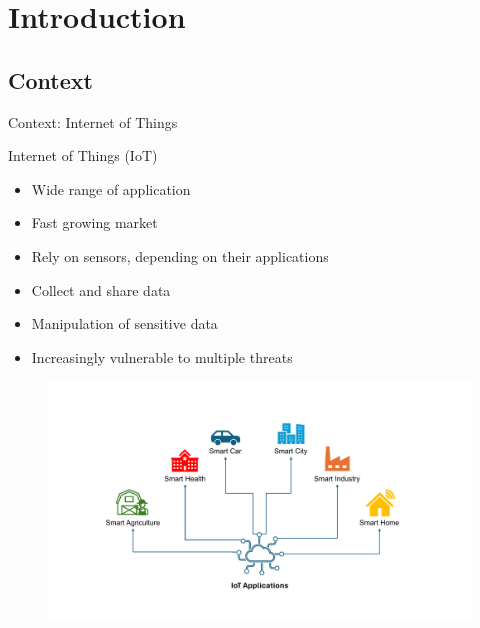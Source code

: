 \section*{Introduction}

\subsection{Context}
\begin{frame}{Context: Internet of Things}
    \begin{minipage}[c]{0.5\textwidth}
        \begin{block}{Internet of Things (IoT)}
            \begin{itemize}
                [square]
                \justifying
                \item Wide range of application
                \item Fast growing market
                \item Rely on sensors, depending on their applications
                \item Collect and share data
                \item Manipulation of sensitive data
                \item Increasingly vulnerable to multiple threats
            \end{itemize}
        \end{block}
    \end{minipage}\hfill%
    \begin{minipage}[c]{0.5\textwidth}
        \begin{figure}
            \centering
            \includegraphics[width=.78\textwidth, trim={4.5cm 2.25cm 5.75cm 3.25cm}, clip]{src/1_introduction/img/iotapplications.pdf}
            \label{fig:iot_application}

\end{figure}
\end{minipage}
\end{frame}
